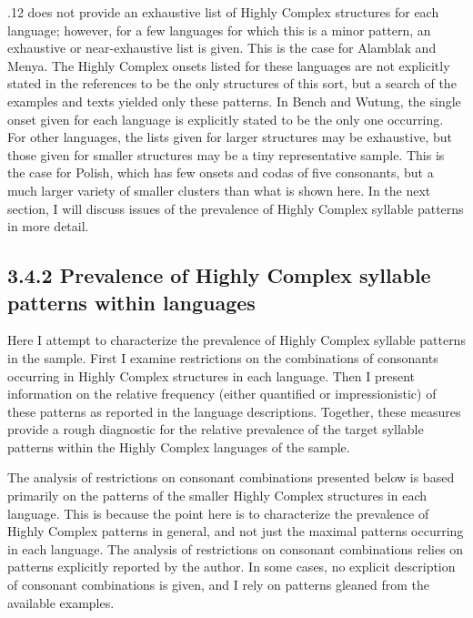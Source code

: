  .12 does not provide an exhaustive list of Highly Complex structures for each language; however, for a few languages for which this is a minor pattern, an exhaustive or near-exhaustive list is given. This is the case for Alamblak and Menya. The Highly Complex onsets listed for these languages are not explicitly stated in the references to be the only structures of this sort, but a search of the examples and texts yielded only these patterns. In Bench and Wutung, the single onset given for each language is explicitly stated to be the only one occurring. For other languages, the lists given for larger structures may be exhaustive, but those given for smaller structures may be a tiny representative sample. This is the case for Polish, which has few onsets and codas of five consonants, but a much larger variety of smaller clusters than what is shown here. In the next section, I will discuss issues of the prevalence of Highly Complex syllable patterns in more detail.


\subsection{3.4.2 Prevalence of Highly Complex syllable patterns within languages}

  Here I attempt to characterize the prevalence of Highly Complex syllable patterns in the sample. First I examine restrictions on the combinations of consonants occurring in Highly Complex structures in each language. Then I present information on the relative frequency (either quantified or impressionistic) of these patterns as reported in the language descriptions. Together, these measures provide a rough diagnostic for the relative prevalence of the target syllable patterns within the Highly Complex languages of the sample.



  The analysis of restrictions on consonant combinations presented below is based primarily on the patterns of the smaller Highly Complex structures in each language. This is because the point here is to characterize the prevalence of Highly Complex patterns in general, and not just the maximal patterns occurring in each language. The analysis of restrictions on consonant combinations relies on patterns explicitly reported by the author. In some cases, no explicit description of consonant combinations is given, and I rely on patterns gleaned from the available examples. 




